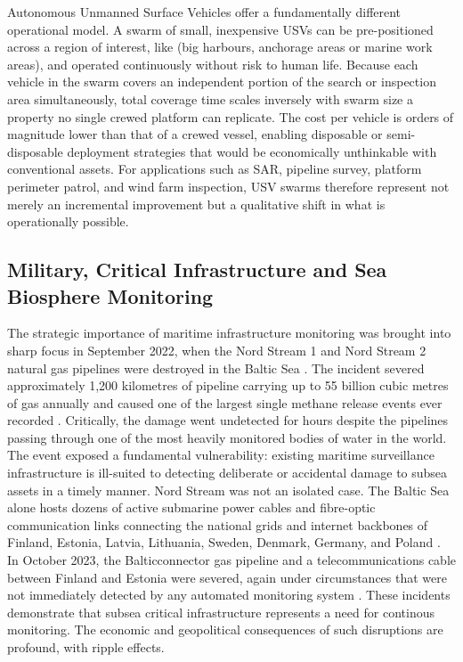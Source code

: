 Autonomous Unmanned Surface Vehicles offer a fundamentally 
different operational model. A swarm of small, inexpensive USVs can be 
pre-positioned across a region of interest, like (big harbours, 
anchorage areas or marine work areas), and 
operated continuously without risk to human life. Because 
each vehicle in the swarm covers an independent portion of the search or 
inspection area simultaneously, total coverage time scales inversely 
with swarm size a property no single crewed platform can replicate. 
The cost per vehicle is orders of magnitude lower than that of a crewed 
vessel, enabling disposable or semi-disposable deployment strategies 
that would be economically unthinkable with conventional assets. For 
applications such as SAR, pipeline survey, platform perimeter patrol, 
and wind farm inspection, USV swarms therefore represent not merely an 
incremental improvement but a qualitative shift in what is operationally 
possible.


\subsection{Military, Critical Infrastructure and Sea Biosphere Monitoring}

The strategic importance of maritime infrastructure monitoring was 
brought into sharp focus in September 2022, when the Nord Stream 1 and 
Nord Stream 2 natural gas pipelines were destroyed in the Baltic Sea 
\cite{nordstream_website}. The incident severed 
approximately 1,200 kilometres of pipeline carrying up to 55 billion 
cubic metres of gas annually and caused one of the largest single 
methane release events ever recorded \cite{mohrmann2025nordstream}. 
Critically, the damage went undetected for hours despite the pipelines 
passing through one of the most heavily monitored bodies of water in 
the world. The event exposed a fundamental vulnerability: existing 
maritime surveillance infrastructure is ill-suited to detecting 
deliberate or accidental damage to subsea assets in a timely manner. 
Nord Stream was not an isolated case. The Baltic Sea alone hosts 
dozens of active submarine power cables and fibre-optic communication 
links connecting the national grids and internet backbones of Finland, 
Estonia, Latvia, Lithuania, Sweden, Denmark, Germany, and Poland 
\cite{balticcable}. In October 2023, the Balticconnector gas pipeline 
and a telecommunications cable between Finland and Estonia were severed, 
again under circumstances that were not immediately detected by any 
automated monitoring system \cite{cinea_balticconnector}. These incidents demonstrate that subsea critical infrastructure represents a need for continous monitoring. The economic and geopolitical consequences of such disruptions are profound, with ripple effects.

